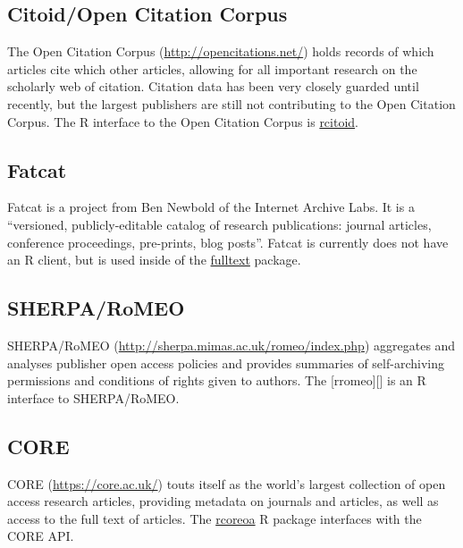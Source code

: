 \documentclass[author-year, review, 11pt]{components/elsarticle} %
\begin{document}
\hypertarget{citoidopen-citation-corpus}{%
\subsection{Citoid/Open Citation
Corpus}\label{citoidopen-citation-corpus}}

The Open Citation Corpus (\url{http://opencitations.net/}) holds records
of which articles cite which other articles, allowing for all important
research on the scholarly web of citation. Citation data has been very
closely guarded until recently, but the largest publishers are still not
contributing to the Open Citation Corpus. The R interface to the Open
Citation Corpus is
\href{https://github.com/ropenscilabs/rcitoid}{rcitoid}.

\hypertarget{fatcat}{%
\subsection{Fatcat}\label{fatcat}}

Fatcat is a project from Ben Newbold of the Internet Archive Labs. It is
a ``versioned, publicly-editable catalog of research publications:
journal articles, conference proceedings, pre-prints, blog posts''.
Fatcat is currently does not have an R client, but is used inside of the
\href{https://github.com/ropensci/fulltext}{fulltext} package.

\hypertarget{sherparomeo}{%
\subsection{SHERPA/RoMEO}\label{sherparomeo}}

SHERPA/RoMEO (\url{http://sherpa.mimas.ac.uk/romeo/index.php})
aggregates and analyses publisher open access policies and provides
summaries of self-archiving permissions and conditions of rights given
to authors. The {[}rromeo{]}{[}{]} is an R interface to SHERPA/RoMEO.

\hypertarget{core}{%
\subsection{CORE}\label{core}}

CORE (\url{https://core.ac.uk/}) touts itself as the world's largest
collection of open access research articles, providing metadata on
journals and articles, as well as access to the full text of articles.
The \href{https://github.com/ropensci/rcoreoa}{rcoreoa} R package
interfaces with the CORE API.
\end{document}
